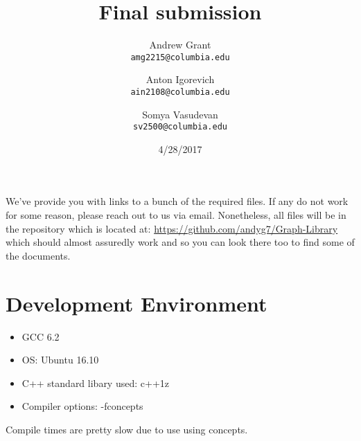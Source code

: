 \documentclass{article}
\title{Final submission}
\author{
Andrew Grant\\
\texttt{amg2215@columbia.edu}
\and 
Anton Igorevich \\
\texttt{ain2108@columbia.edu}
\and
 Somya Vasudevan \\
 \texttt{sv2500@columbia.edu}
}
\date{4/28/2017}
\begin{document}
\maketitle

\section{}
We've provide you with links to a bunch of the required files. If any do not work for some reason, please reach out to us via email. Nonetheless, all files will be in the repository which is located at:  \url{https://github.com/andyg7/Graph-Library} which should almost assuredly work and so you can look there too to find some of the documents.
\par
\section{Development Environment}
\begin{itemize}
\item GCC 6.2
\item OS: Ubuntu 16.10
\item C++ standard libary used: c++1z
\item Compiler options: -fconcepts
\end{itemize}
Compile times are pretty slow due to use using concepts.
\end{document}
